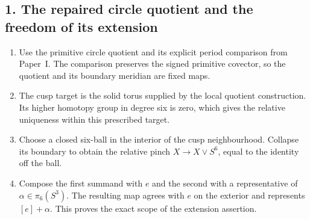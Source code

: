 \subsection*{1. The repaired circle quotient and the freedom of its extension}
\RungOne
\begin{enumerate}[label=\arabic*.,leftmargin=*]
\item Use the primitive circle quotient and its explicit period
comparison from Paper~I.  The comparison preserves the signed primitive
covector, so the quotient and its boundary meridian are fixed maps.
\item The cusp target is the solid torus supplied by the local quotient
construction.  Its higher homotopy group in degree six is zero, which
gives the relative uniqueness within this prescribed target.
\item Choose a closed six-ball in the interior of the cusp
neighbourhood.  Collapse its boundary to obtain the relative pinch
$X\to X\vee S^6$, equal to the identity off the ball.
\item Compose the first summand with $e$ and the second with a
representative of $\alpha\in\pi_6(S^3)$.  The resulting map agrees
with $e$ on the exterior and represents $[e]+\alpha$.
This proves the exact scope of the extension assertion.
\end{enumerate}

